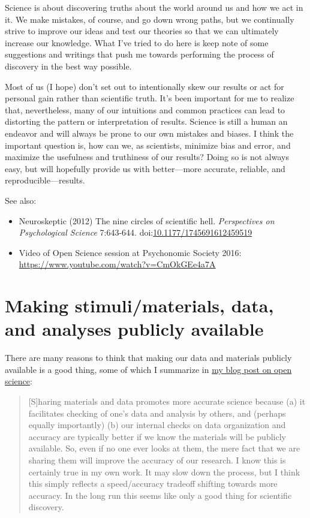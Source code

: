 \documentclass[letterpaper,oneside,11pt,article, portrait]{memoir}
\newcommand{\doi}[1]{doi:\href{http://dx.doi.org/#1}{#1}}
\newcommand{\journal}[1]{\textit{#1}} 			%
\begin{document}
Science is about discovering truths about the world around us and how we act in it. We make mistakes, of course, and go down wrong paths, but we continually strive to improve our ideas and test our theories so that we can ultimately increase our knowledge. What I've tried to do here is keep note of some suggestions and writings that push me towards performing the process of discovery in the best way possible.

Most of us (I hope) don't set out to intentionally skew our results or act for personal gain rather than scientific truth. It's been important for me to realize that, nevertheless, many of our intuitions and common practices can lead to distorting the pattern or interpretation of results. Science is still a human an endeavor and will always be prone to our own mistakes and biases. I think the important question is, how can we, as scientists, minimize bias and error, and maximize the usefulness and truthiness of our results? Doing so is not always easy, but will hopefully provide us with better---more accurate, reliable, and reproducible---results.

\vspace{1em} \noindent See also:

\begin{itemize}
\item Neuroskeptic (2012) The nine circles of scientific hell. \journal{Perspectives on Psychological Science} 7:643-644. \doi{10.1177/1745691612459519}
\item Video of Open Science session at Psychonomic Society 2016: \url{https://www.youtube.com/watch?v=CmOkGEe4a7A}
\end{itemize}



\chapter{Making stimuli/materials, data, and analyses publicly available} \label{open}

There are many reasons to think that making our data and materials publicly available is a good thing, some of which I summarize in \href{http://jonathanpeelle.net/blog/2016/2/29/reviewing-in-support-of-open-science}{my blog post on open science}:

\begin{quote}
[S]haring materials and data promotes more accurate science because (a) it facilitates checking of one's data and analysis by others, and (perhaps equally importantly) (b) our internal checks on data organization and accuracy are typically better if we know the materials will be publicly available. So, even if no one ever looks at them, the mere fact that we are sharing them will improve the accuracy of our research. I know this is certainly true in my own work. It may slow down the process, but I think this simply reflects a speed/accuracy tradeoff shifting towards more accuracy. In the long run this seems like only a good thing for scientific discovery.
\end{quote}
\end{document}
